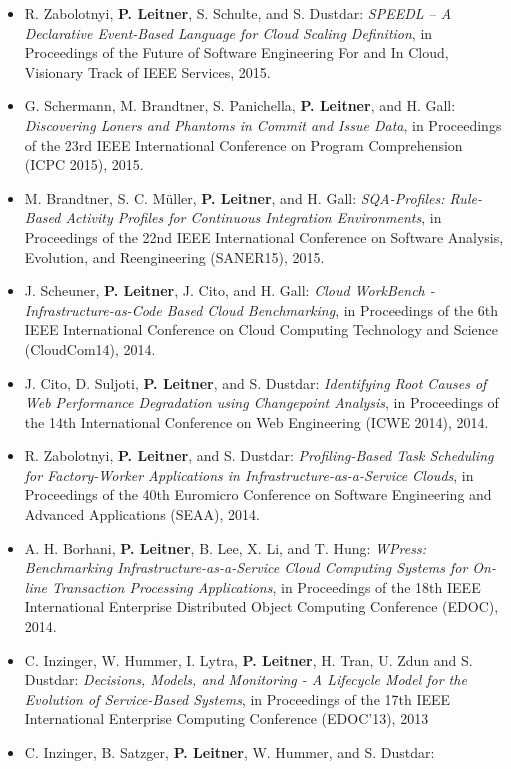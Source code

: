 \documentclass[paper=letter,fontsize=11pt]{scrartcl} %
\begin{document}
\begin{itemize}
      \item R. Zabolotnyi, \textbf{P. Leitner}, S. Schulte, and S. Dustdar: \emph{SPEEDL -- A Declarative Event-Based Language for Cloud Scaling Definition}, in Proceedings of the Future of Software Engineering For and In Cloud, Visionary Track of IEEE Services, 2015.
  \item G. Schermann, M. Brandtner, S. Panichella, \textbf{P. Leitner}, and H. Gall: \emph{Discovering Loners and Phantoms in Commit and Issue Data}, in Proceedings of the 23rd IEEE International Conference
on Program Comprehension (ICPC 2015), 2015.
  \item M. Brandtner, S. C. M\"uller, \textbf{P. Leitner}, and H. Gall: \emph{SQA-Profiles: Rule-Based Activity Profiles for Continuous Integration Environments}, in Proceedings of the 22nd IEEE International Conference on Software Analysis, Evolution, and Reengineering (SANER15), 2015.
  \item J. Scheuner, \textbf{P. Leitner}, J. Cito, and H. Gall: \emph{Cloud WorkBench - Infrastructure-as-Code Based Cloud Benchmarking}, in Proceedings of the 6th IEEE International Conference on Cloud Computing Technology and Science (CloudCom14), 2014.
  \item J. Cito, D. Suljoti, \textbf{P. Leitner}, and S. Dustdar: \emph{Identifying Root Causes of Web Performance Degradation using Changepoint Analysis}, in Proceedings of the 14th International Conference on Web Engineering (ICWE 2014), 2014.
 \item R. Zabolotnyi, \textbf{P. Leitner}, and S. Dustdar: \emph{Profiling-Based Task Scheduling for Factory-Worker Applications in Infrastructure-as-a-Service Clouds}, in Proceedings of the 40th Euromicro Conference on Software Engineering and Advanced Applications (SEAA), 2014.
 \item A. H. Borhani, \textbf{P. Leitner}, B. Lee, X. Li, and T. Hung: \emph{WPress: Benchmarking Infrastructure-as-a-Service Cloud Computing Systems for On-line Transaction Processing Applications}, in Proceedings of the 18th IEEE International Enterprise Distributed Object Computing Conference (EDOC), 2014.
\item C. Inzinger, W. Hummer, I. Lytra, \textbf{P. Leitner}, H. Tran, U. Zdun and S. Dustdar: \emph{Decisions, Models, and Monitoring - A Lifecycle Model for the Evolution of Service-Based Systems}, in Proceedings of the 17th IEEE International Enterprise Computing Conference (EDOC'13), 2013
\item C. Inzinger, B. Satzger, \textbf{P. Leitner}, W. Hummer, and S. Dustdar:

\end{itemize}
\end{document}
